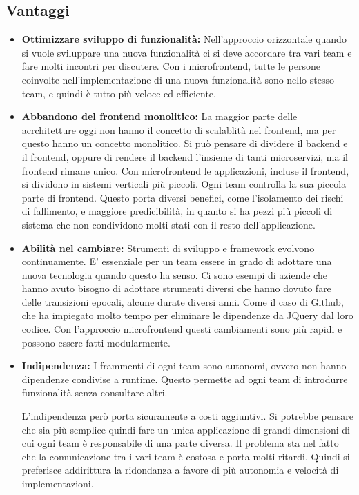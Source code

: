 \subsection*{Vantaggi}
\begin{itemize}
    \item \textbf{Ottimizzare sviluppo di funzionalità:}
Nell’approccio orizzontale quando si vuole sviluppare una nuova funzionalità ci si
 deve accordare tra vari team e fare molti incontri per discutere. Con i microfrontend,
  tutte le persone coinvolte nell’implementazione di una nuova funzionalità sono nello 
  stesso team, e quindi è tutto più veloce ed efficiente. 
    \item \textbf{Abbandono del frontend monolitico:}
La maggior parte delle acrchitetture oggi non hanno il concetto di scalablità nel 
frontend, ma per questo hanno un concetto monolitico.
Si può pensare di dividere il backend e il frontend, oppure di rendere il backend 
l’insieme di tanti microservizi, ma il frontend rimane unico.
Con microfrontend le applicazioni, incluse il frontend, si dividono in sistemi verticali
 più piccoli. Ogni team controlla la sua piccola parte di frontend. Questo porta diversi
  benefici, come l’isolamento dei rischi di fallimento, e maggiore predicibilità, in quanto
   si ha pezzi più piccoli di sistema che non condividono molti stati con il resto dell’applicazione.
    \item \textbf{Abilità nel cambiare:}
Strumenti di sviluppo e framework evolvono continuamente. E’ essenziale per un team 
essere in grado di adottare una nuova tecnologia quando questo ha senso. Ci sono esempi
 di aziende che hanno avuto bisogno di adottare strumenti diversi che hanno dovuto fare 
 delle transizioni epocali, alcune durate diversi anni. Come il caso di Github, che ha 
 impiegato molto tempo per eliminare le dipendenze da JQuery dal loro codice.
  Con l’approccio microfrontend questi cambiamenti sono più rapidi e possono essere
   fatti modularmente.


\item \textbf{Indipendenza:}
I frammenti di ogni team sono autonomi, ovvero non hanno dipendenze condivise a runtime.
 Questo permette ad ogni team di introdurre funzionalità senza consultare altri.

L’indipendenza però porta sicuramente a costi aggiuntivi. Si potrebbe pensare che sia
 più semplice quindi fare un unica applicazione di grandi dimensioni di cui ogni team
  è responsabile di una parte diversa. Il problema sta nel fatto che la comunicazione 
  tra i vari team è costosa e porta molti ritardi.
Quindi si preferisce addirittura la ridondanza a favore di più autonomia e velocità di
 implementazioni.

\end{itemize}

